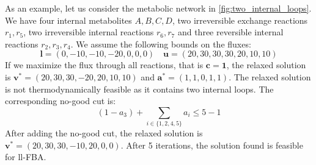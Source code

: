 As an example, let us consider the metabolic network in \cref{fig:two_internal_loops}. We have four internal metabolites $A,B,C, D$, two irreversible exchange reactions $r_1, r_5$, two irreversible internal reactions $ r_6, r_7$ and three reversible internal reactions $r_2, r_3, r_4$. We assume the following bounds on the fluxes: 
\begin{equation*}
    \mathbf l = (0,-10,-10,-20,0,0,0) \quad \mathbf u = (20,30,30,30,20,10,10)
\end{equation*}
If we maximize the flux through all reactions, that is $\mathbf c = \mathbf 1$, the relaxed solution is $\mathbf v^* = (20, 30, 30, -20, 20, 10, 10)$ and $\boldsymbol a^* = (1,1,0,1,1)$. The relaxed solution is not thermodynamically feasible as it contains two internal loops. The corresponding no-good cut is:
\begin{equation*}
    (1-a_3) + \sum_{i \in \{1,2,4,5\}} a_i \leq 5-1
\end{equation*}
After adding the no-good cut, the relaxed solution is $\mathbf v^* = (20, 30, 30, -10, 20, 0, 0)$. After 5 iterations, the solution found is feasible for \textsf{ll-FBA}.

